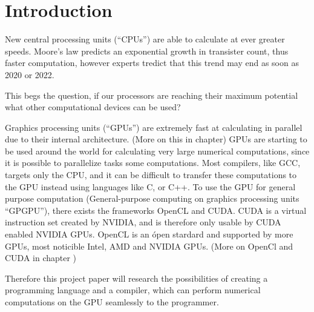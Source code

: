 \chapter{Introduction}\label{ch:introduction}


New central processing units (``CPUs'') are able to calculate at ever greater speeds.
Moore's law predicts an exponential growth in transister count, thus faster computation, however experts tredict that this trend may end as soon as 2020 or 2022. \citep{Moore2013}

This begs the question, if our processors are reaching their maximum potential what other computational devices can be used?

Graphics processing units (``GPUs'') are extremely fast at calculating in parallel due to their internal architecture. (More on this in chapter)
GPUs are starting to be used around the world for calculating very large numerical computations, since it is possible to parallelize tasks some computations.
Most compilers, like GCC, targets only the CPU, and it can be difficult to transfer these computations to the GPU instead using languages like C, or C++.
To use the GPU for general purpose computation (General-purpose computing on graphics processing units ``GPGPU''), there exists the frameworks OpenCL and CUDA.
CUDA is a virtual instruction set created by NVIDIA, and is therefore only usable by CUDA enabled NVIDIA GPUs.
OpenCL is an ópen stardard and supported by more GPUs, most noticible Intel, AMD and NVIDIA GPUs. (More on OpenCl and CUDA in chapter )

Therefore this project paper will research the possibilities of creating a programming language and a compiler, which can perform numerical computations on the GPU seamlessly to the programmer. 
